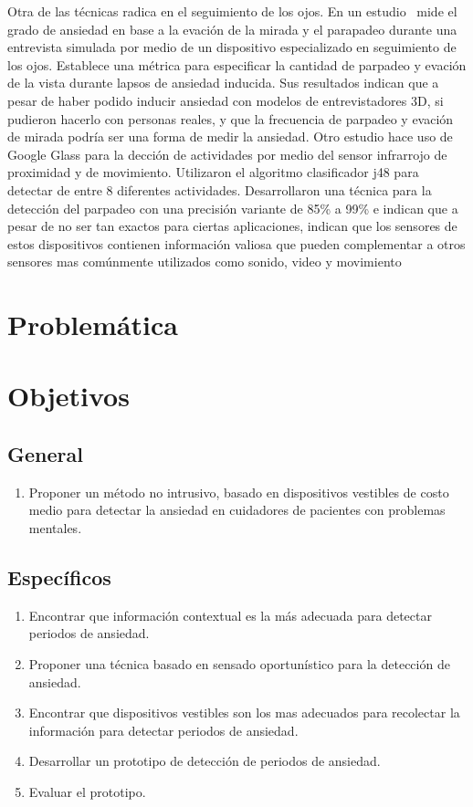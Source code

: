 \documentclass[letterpaper,12pt]{cicese}
\begin{document}
				Otra de las t\'ecnicas radica en el seguimiento de los ojos. En un estudio \citep{Kwon2009} mide el grado de ansiedad en base a la evaci\'on de la mirada y el parapadeo durante una entrevista simulada por medio de un dispositivo especializado en seguimiento de los ojos. Establece una m\'etrica para especificar la cantidad de parpadeo y evaci\'on de la vista durante lapsos de ansiedad inducida. Sus resultados indican que a pesar de haber podido inducir ansiedad con modelos de entrevistadores 3D, si pudieron hacerlo con personas reales, y que la frecuencia de parpadeo y evaci\'on de mirada podr\'ia ser una forma de medir la ansiedad. Otro estudio hace uso de Google Glass para la decci\'on de actividades por medio del sensor infrarrojo de proximidad y de movimiento. Utilizaron el algoritmo clasificador j48 para detectar de entre 8 diferentes actividades. Desarrollaron una t\'ecnica para la detecci\'on del parpadeo con una precisi\'on variante de 85\% a 99\% e indican que a pesar de no ser tan exactos para ciertas aplicaciones, indican que los sensores de estos dispositivos contienen informaci\'on valiosa que pueden complementar a otros sensores mas com\'unmente utilizados como sonido, video y movimiento \citep{Ishimaru2014}
					
		\chapter{Problem\'atica}
		\chapter{Objetivos}
			\section{General}
				\begin{enumerate}
					\item Proponer un m\'etodo no intrusivo, basado en dispositivos vestibles de costo medio para detectar la ansiedad en cuidadores de pacientes con problemas mentales.
				\end{enumerate}
			\section{Espec\'ificos}
				\begin{enumerate}
					\item Encontrar que informaci\'on contextual es la m\'as adecuada para detectar periodos de ansiedad.
					\item Proponer una t\'ecnica basado en sensado oportun\'istico para la detecci\'on de ansiedad.
					\item Encontrar que dispositivos vestibles son los mas adecuados para recolectar la informaci\'on para detectar periodos de ansiedad.
					\item Desarrollar un prototipo de detecci\'on de periodos de ansiedad.
					\item Evaluar el prototipo.
				\end{enumerate}
\end{document}
